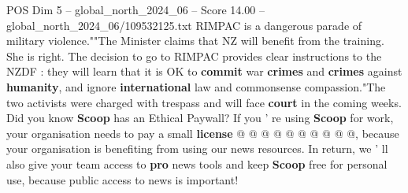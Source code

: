 \begin{textsample}{POS Dim 5 – global\_north\_2024\_06 – Score 14.00 – global\_north\_2024\_06/109532125.txt}
RIMPAC is a dangerous parade of military violence.""The Minister claims that NZ will benefit from the training.
She is right.
The decision to go to RIMPAC provides clear instructions to the NZDF : they will learn that it is OK to \textbf{commit} war \textbf{crimes} and \textbf{crimes} against \textbf{humanity}, and ignore \textbf{international} law and commonsense compassion."The two activists were charged with trespass and will face \textbf{court} in the coming weeks.
Did you know \textbf{Scoop} has an Ethical Paywall?
If you ' re using \textbf{Scoop} for work, your organisation needs to pay a small \textbf{license} @ @ @ @ @ @ @ @ @ @, because your organisation is benefiting from using our news resources.
In return, we ' ll also give your team access to \textbf{pro} news tools and keep \textbf{Scoop} free for personal use, because public access to news is important!

\end{textsample}
